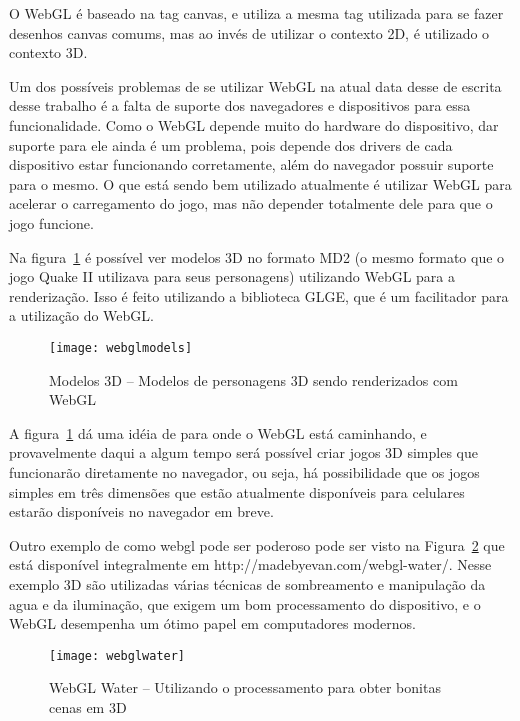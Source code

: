 O WebGL é baseado na tag canvas, e utiliza a mesma tag utilizada para
se fazer desenhos canvas comums, mas ao invés de utilizar o contexto
2D, é utilizado o contexto 3D.

Um dos possíveis problemas de se utilizar WebGL na atual data desse
de escrita desse trabalho é a falta de suporte dos navegadores e
dispositivos para essa funcionalidade. Como o WebGL depende muito do
hardware do dispositivo, dar suporte para ele ainda é um problema,
pois depende dos drivers de cada dispositivo estar funcionando
corretamente, além do navegador possuir suporte para o mesmo.
O que está sendo bem utilizado atualmente é utilizar WebGL para
acelerar o carregamento do jogo, mas não depender totalmente dele para
que o jogo funcione.

Na figura~\ref{img:webglmodels} é possível ver modelos 3D no formato
MD2 (o mesmo formato que o jogo Quake II utilizava para seus
personagens) utilizando WebGL para a renderização. Isso é feito utilizando a
biblioteca GLGE, que é um facilitador para a utilização do WebGL.

\begin{figure}[H]
  \centering
	\texttt{[image: webglmodels]}
  \caption{Modelos 3D {--} Modelos de personagens 3D sendo renderizados com WebGL}
  \label{img:webglmodels}
\end{figure}

A figura~\ref{img:webglmodels} dá uma idéia de para onde o WebGL está
caminhando, e provavelmente daqui a algum tempo será possível criar
jogos 3D simples que funcionarão diretamente no navegador, ou seja, há
possibilidade que os jogos simples em três dimensões que estão atualmente
disponíveis para celulares estarão disponíveis no navegador em breve.

Outro exemplo de como webgl pode ser poderoso pode ser visto na Figura~\ref{img:webglwater}
que está disponível integralmente em http://madebyevan.com/webgl-water/.
Nesse exemplo 3D são utilizadas várias técnicas de sombreamento e
manipulação da agua e da iluminação, que exigem um bom processamento
do dispositivo, e o WebGL desempenha um ótimo papel em computadores
modernos.

\begin{figure}[H]
  \centering
	\texttt{[image: webglwater]}
  \caption{WebGL Water {--} Utilizando o processamento para obter
  bonitas cenas em 3D}
  \label{img:webglwater}
\end{figure}

